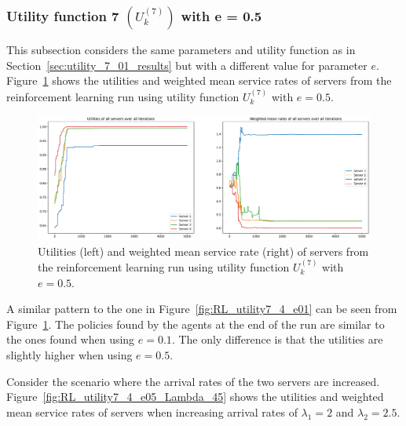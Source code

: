 \subsubsection{Utility function 7 \((U_k^{(7)})\) with e = 0.5}
\label{sec:utility_7_05_results}

This subsection considers the same parameters and utility function as in
Section~\ref{sec:utility_7_01_results} but with a different value for
parameter \(e\).
Figure~\ref{fig:RL_utility7_4_e05} shows the utilities and weighted mean
service rates of servers from the reinforcement learning run using utility
function \(U_k^{(7)}\) with \(e = 0.5\).

\begin{figure}[H]
    \includegraphics[width=\textwidth]{chapters/06_agent_based_extension/Bin/reinforcement_learning_results/utility_7/u7_4_e05.pdf}
    \caption{Utilities (left) and weighted mean service rate (right) of servers
    from the reinforcement learning run using utility function \(U_k^{(7)}\)
    with \(e = 0.5\).}
    \label{fig:RL_utility7_4_e05}
\end{figure}

A similar pattern to the one in Figure~\ref{fig:RL_utility7_4_e01} can be seen
from Figure~\ref{fig:RL_utility7_4_e05}.
The policies found by the agents at the end of the run are similar to the ones
found when using \(e = 0.1\).
The only difference is that the utilities are slightly higher when using
\(e = 0.5\).

Consider the scenario where the arrival rates of the two servers are increased.
Figure~\ref{fig:RL_utility7_4_e05_Lambda_45} shows the utilities and weighted
mean service rates of servers when increasing arrival rates of
\(\lambda_1 = 2\) and \(\lambda_2 = 2.5\).

